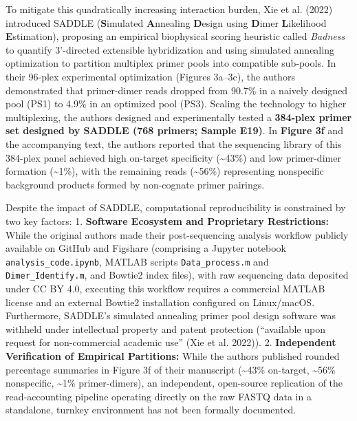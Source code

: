 \documentclass[
]{article}
\begin{document}
To mitigate this quadratically increasing interaction burden, Xie et al.
(2022) introduced SADDLE (\textbf{S}imulated \textbf{A}nnealing
\textbf{D}esign using \textbf{D}imer \textbf{L}ikelihood
\textbf{E}stimation), proposing an empirical biophysical scoring
heuristic called \emph{Badness} to quantify 3'-directed extensible
hybridization and using simulated annealing optimization to partition
multiplex primer pools into compatible sub-pools. In their 96-plex
experimental optimization (Figures 3a--3c), the authors demonstrated
that primer-dimer reads dropped from 90.7\% in a naively designed pool
(PS1) to 4.9\% in an optimized pool (PS3). Scaling the technology to
higher multiplexing, the authors designed and experimentally tested a
\textbf{384-plex primer set designed by SADDLE (768 primers; Sample
E19)}. In \textbf{Figure 3f} and the accompanying text, the authors
reported that the sequencing library of this 384-plex panel achieved
high on-target specificity (\textasciitilde43\%) and low primer-dimer
formation (\textasciitilde1\%), with the remaining reads
(\textasciitilde56\%) representing nonspecific background products
formed by non-cognate primer pairings.

Despite the impact of SADDLE, computational reproducibility is
constrained by two key factors: 1. \textbf{Software Ecosystem and
Proprietary Restrictions:} While the original authors made their
post-sequencing analysis workflow publicly available on GitHub and
Figshare (comprising a Jupyter notebook \texttt{analysis\_code.ipynb},
MATLAB scripts \texttt{Data\_process.m} and \texttt{Dimer\_Identify.m},
and Bowtie2 index files), with raw sequencing data deposited under CC BY
4.0, executing this workflow requires a commercial MATLAB license and an
external Bowtie2 installation configured on Linux/macOS. Furthermore,
SADDLE's simulated annealing primer pool design software was withheld
under intellectual property and patent protection (``available upon
request for non-commercial academic use'' (Xie et al. 2022)). 2.
\textbf{Independent Verification of Empirical Partitions:} While the
authors published rounded percentage summaries in Figure 3f of their
manuscript (\textasciitilde43\% on-target, \textasciitilde56\%
nonspecific, \textasciitilde1\% primer-dimers), an independent,
open-source replication of the read-accounting pipeline operating
directly on the raw FASTQ data in a standalone, turnkey environment has
not been formally documented.
\end{document}
